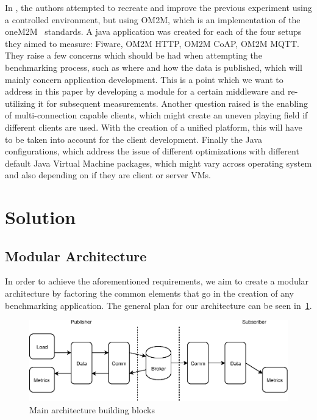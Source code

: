 \documentclass[conference]{IEEEtran}
\begin{document}
In \cite{pereira_benchmarking_2018}, the authors attempted to recreate and improve the previous experiment using a controlled environment, but using OM2M, which is an implementation of the oneM2M~\cite{oneM2MHo30:online} standards. A java application was created for each of the four setups they aimed to measure: Fiware, OM2M HTTP, OM2M CoAP, OM2M MQTT. They raise a few concerns which should be had when attempting the benchmarking process, such as where and how the data is published, which will mainly concern application development. This is a point which we want to address in this paper by developing a module for a certain middleware and re-utilizing it for subsequent measurements. Another question raised is the enabling of multi-connection capable clients, which might create an uneven playing field if different clients are used. With the creation of a unified platform, this will have to be taken into account for the client development. Finally the Java configurations, which address the issue of different optimizations with different default Java Virtual Machine packages, which might vary across operating system and also depending on if they are client or server VMs.

\section{Solution}

\subsection{Modular Architecture}

In order to achieve the aforementioned requirements, we aim to create a modular architecture by factoring the common elements that go in the creation of any benchmarking application. The general plan for our architecture can be seen in~\ref{fig:benchmark_architecture}.

\begin{figure}[htbp!]
  \centering
  \includegraphics[width=\linewidth]{figures/benchmark_architecture.eps}
  \caption{Main architecture building blocks}
  \label{fig:benchmark_architecture}
\end{figure}
\end{document}

